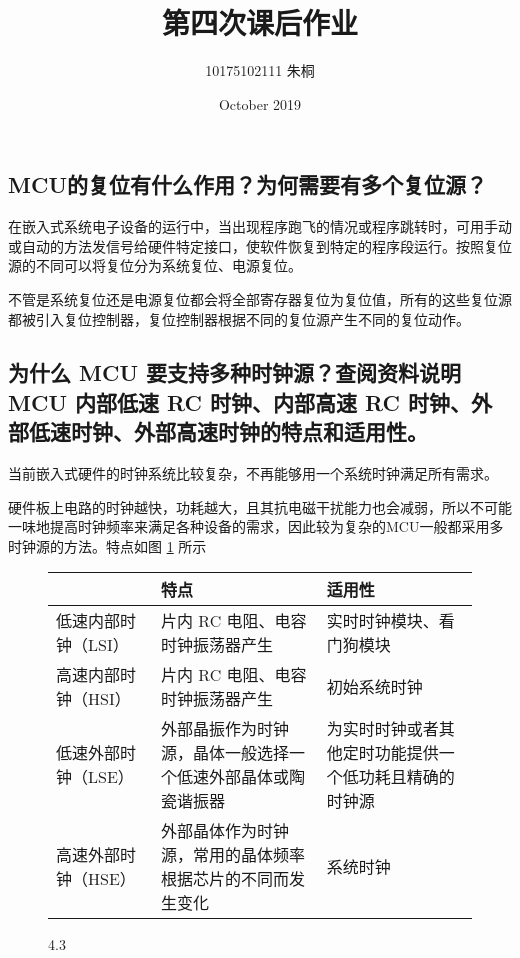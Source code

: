 \documentclass{article}
\title{第四次课后作业}
\author{10175102111 朱桐}
\date{October 2019}
\begin{document}
\maketitle


\setcounter{section}{4}

\setcounter{subsection}{0}
\subsection{MCU的复位有什么作用？为何需要有多个复位源？}

在嵌入式系统电子设备的运行中，当出现程序跑飞的情况或程序跳转时，可用手动或自动的方法发信号给硬件特定接口，使软件恢复到特定的程序段运行。按照复位源的不同可以将复位分为系统复位、电源复位。

不管是系统复位还是电源复位都会将全部寄存器复位为复位值，所有的这些复位源都被引入复位控制器，复位控制器根据不同的复位源产生不同的复位动作。

\setcounter{subsection}{2}
\subsection{为什么 MCU 要支持多种时钟源？查阅资料说明 MCU 内部低速 RC 时钟、内部高速 RC 时钟、外部低速时钟、外部高速时钟的特点和适用性。}

当前嵌入式硬件的时钟系统比较复杂，不再能够用一个系统时钟满足所有需求。

硬件板上电路的时钟越快，功耗越大，且其抗电磁干扰能力也会减弱，所以不可能一味地提高时钟频率来满足各种设备的需求，因此较为复杂的MCU一般都采用多时钟源的方法。特点如图 \ref{fig:1} 所示

\begin{figure}[h]
  \centering
  \begin{tabularx}{0.9\textwidth}{|X|X|X|}
    \hline & 特点 & 适用性 \\ \hline
    低速内部时钟（LSI） &	片内 RC 电阻、电容时钟振荡器产生 & 实时时钟模块、看门狗模块 \\ \hline 
    高速内部时钟（HSI） &	片内 RC 电阻、电容时钟振荡器产生 & 初始系统时钟 \\ \hline 
    低速外部时钟（LSE） & 外部晶振作为时钟源，晶体一般选择一个低速外部晶体或陶瓷谐振器 &为实时时钟或者其他定时功能提供一个低功耗且精确的时钟源 \\ \hline
    高速外部时钟（HSE）& 外部晶体作为时钟源，常用的晶体频率根据芯片的不同而发生变化& 系统时钟 \\ \hline
  \end{tabularx}
  \caption{4.3}
  \label{fig:1}
\end{figure}
\end{document}
